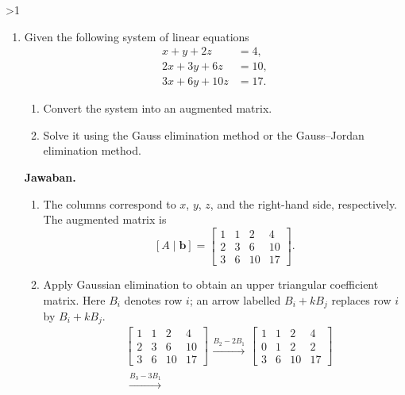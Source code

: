\documentclass[12pt]{article}
\newcommand{\answername}{Jawaban}
\newenvironment{soaljawab}[1]{%
    \ifnum#1>1\clearpage\fi
    \begin{tcolorbox}[enhanced,breakable,height fill,height fixed for=all,
        sharp corners,colback=white,colframe=black,boxrule=0.4bp,
        boxsep=0pt,left=12bp,right=12bp,top=6bp,bottom=10bp,
        before skip=0pt,after skip=0pt,pad at break=8bp]
    \fontsize{12bp}{14bp}\selectfont
    \setlength{\abovedisplayskip}{8bp}
    \setlength{\belowdisplayskip}{8bp}
    \setlength{\abovedisplayshortskip}{8bp}
    \setlength{\belowdisplayshortskip}{8bp}
    \renewcommand{\arraystretch}{1.15}
    \begin{enumerate}[start=#1,topsep=0pt]
}{%
    \end{enumerate}
    \end{tcolorbox}
}
\newcommand{\jawaban}{\par\medskip\textbf{\answername.}\par\smallskip}
\begin{document}
\begin{soaljawab}{5}
\item Given the following system of linear equations
        \[
          \begin{aligned}
            x + y + 2z    & = 4,  \\
            2x + 3y + 6z  & = 10, \\
            3x + 6y + 10z & = 17.
          \end{aligned}
        \]
        \begin{enumerate}
          \item Convert the system into an augmented matrix.
          \item Solve it using the Gauss elimination method or the Gauss--Jordan elimination method.
        \end{enumerate}
\jawaban
\begin{enumerate}
\item The columns correspond to $x$, $y$, $z$, and the right-hand side, respectively.
The augmented matrix is
\[
    [A\mid\mathbf b] = \left[\begin{array}{ccc|c}
            1 & 1 & 2 & 4 \\
            2 & 3 & 6 & 10 \\
            3 & 6 & 10 & 17
        \end{array}\right].
\]
\item Apply Gaussian elimination to obtain an upper triangular coefficient matrix.
Here $B_i$ denotes row $i$; an arrow labelled $B_i+kB_j$ replaces row $i$
by $B_i+kB_j$.
{\setlength{\arraycolsep}{4bp}
\begin{align*}
    & \left[\begin{array}{ccc|c}
            1 & 1 & 2 & 4 \\
            2 & 3 & 6 & 10 \\
            3 & 6 & 10 & 17
        \end{array}\right]
        \begin{array}{c}\xrightarrow{B_2-2B_1}\end{array}
        \left[\begin{array}{ccc|c}
            1 & 1 & 2 & 4 \\
            0 & 1 & 2 & 2 \\
            3 & 6 & 10 & 17
        \end{array}\right] \\[6bp]
    & \begin{array}{c}\xrightarrow{B_3-3B_1}\end{array}

\end{align*}}
\end{enumerate}
\end{soaljawab}
\end{document}
